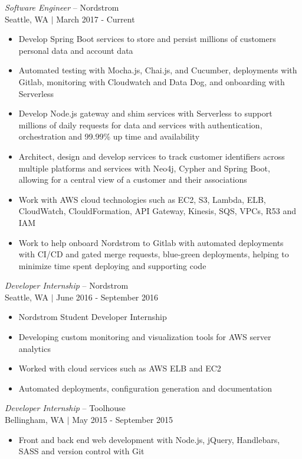 \documentclass[line,margin]{res}
\begin{document}
\begin{resume}
	{\sl Software Engineer} -- {\footnotesize Nordstrom} \\
	{\footnotesize Seattle, WA $|$  March 2017 - Current}
	\begin{itemize} \itemsep -2pt
		\item Develop Spring Boot services to store and persist millions of customers personal data and account data
		\item Automated testing with Mocha.js, Chai.js, and Cucumber, deployments with Gitlab, monitoring with Cloudwatch and Data Dog, and onboarding with Serverless
		\item Develop Node.js gateway and shim services with Serverless to support millions of daily requests for data and services with authentication, orchestration and 99.99\% up time and availability
		\item Architect, design and develop services to track customer identifiers across multiple platforms and services with Neo4j, Cypher and Spring Boot, allowing for a central view of a customer and their associations
		\item Work with AWS cloud technologies such as EC2, S3, Lambda, ELB, CloudWatch, ClouldFormation, API Gateway, Kinesis, SQS, VPCs, R53 and IAM
		\item Work to help onboard Nordstrom to Gitlab with automated deployments with CI/CD and gated merge requests, blue-green deployments, helping to minimize time spent deploying and supporting code
	\end{itemize}
	{\sl Developer Internship} -- {\footnotesize Nordstrom} \\
	{\footnotesize Seattle, WA $|$  June 2016 - September 2016}
	\begin{itemize} \itemsep -2pt
		\item Nordstrom Student Developer Internship
		\item Developing custom monitoring and visualization tools for AWS server analytics
		\item Worked with cloud services such as AWS ELB and EC2
		\item Automated deployments, configuration generation and documentation
	\end{itemize}
	{\sl Developer Internship} -- {\footnotesize Toolhouse} \\
	{\footnotesize Bellingham, WA $|$  May 2015 - September 2015}
	\begin{itemize} \itemsep -2pt
		\item Front and back end web development with Node.js, jQuery, Handlebars, SASS and version control with Git

\end{itemize}
\end{resume}
\end{document}
